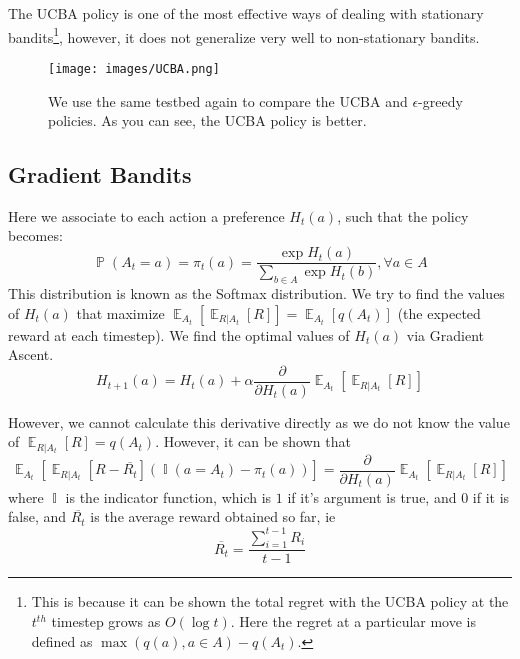 \documentclass[12pt]{report}
\begin{document}
The UCBA policy is one of the most effective ways of dealing with stationary bandits\footnote{This is because it can be shown the total regret with the UCBA policy at the $t^{th}$ timestep grows as $O(\log t)$. Here the regret at a particular move is defined as $\max(q(a), a \in A) - q(A_{t})$.}, however, it does not generalize very well
to non-stationary bandits. 
\begin{figure}[h!]
    \centering
    \texttt{[image: images/UCBA.png]}
    \caption{We use the same testbed again to compare the UCBA and $\epsilon$-greedy policies. As you can see, the UCBA policy is better.}
\end{figure}

\subsection{Gradient Bandits}
Here we associate to each action a preference $H_{t}(a)$, such that the policy becomes:
\begin{equation}
    \mathop{\mathbb{P}}(A_{t} = a) = \pi_{t}(a) = \frac{\exp{H_{t}(a)}}{\sum\limits_{b \in A} \exp{H_{t}(b)}}, \forall a \in A
\end{equation}
This distribution is known as the Softmax distribution. We try to find the values of $H_{t}(a)$ that maximize $\mathop{\mathbb{E}}_{A_{t}}\left[\mathop{\mathbb{E}}_{R | A_{t}}\left[R\right]\right] = \mathop{\mathbb{E}}_{A_{t}}\left[q(A_{t})\right]$ (the expected reward at each timestep). 
We find the optimal values of $H_{t}(a)$ via Gradient Ascent.
\begin{equation}
    H_{t + 1}(a) = H_{t}(a) + \alpha \frac{\partial}{\partial H_{t}(a)} \mathop{\mathbb{E}}_{A_{t}}\left[\mathop{\mathbb{E}}_{R | A_{t}}\left[R\right]\right]
\end{equation}

However, we cannot calculate this derivative directly as we do not know the value of $\mathop{\mathbb{E}}_{R | A_{t}}\left[R\right] = q(A_{t})$. However, it can be shown that
\begin{equation}
    \mathop{\mathbb{E}}_{A_{t}}\left[\mathop{\mathbb{E}}_{R | A_{t}}\left[R - \overline{R_{t}}\right](\mathop{\mathbb{I}}(a = A_{t}) - \pi_{t}(a))\right] = \frac{\partial}{\partial H_{t}(a)}\mathop{\mathbb{E}}_{A_{t}}\left[\mathop{\mathbb{E}}_{R | A_{t}}\left[R\right]\right]
\end{equation}
where $\mathop{\mathbb{I}}$ is the indicator function, which is $1$ if it's argument is true, and $0$ if it is false, and $\overline{R_{t}}$ is the average reward obtained so far, ie
\begin{equation}
    \overline{R_{t}} = \frac{\sum\limits_{i = 1}^{t - 1} R_{i}}{t - 1}
\end{equation}
\end{document}
